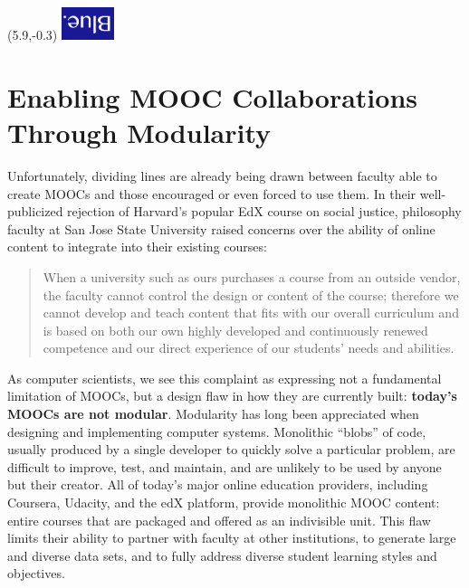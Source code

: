 

\def\thetitle{Enabling MOOC Collaborations Through Modularity}
\def\shorttitle{Modular MOOCs}
\def\theauthors{Geoffrey Challen (\textit{University at Buffalo}) and Margo
Seltzer (\textit{Harvard University})}
\def\shortauthors{Challen}
\def\submissiondate{04/07/2014}
\def\whitepapername{Learning with MOOCs}



\ifdefined\isblue
\begin{textblock}{1}(5.9,-0.3)
\noindent\href{http://blue.cse.buffalo.edu}{\includegraphics[width=0.6in]{./figures/logos/blue.jpg}}
\end{textblock}
\else
\fi

\pagestyle{whitepaper}
\thispagestyle{emptywhitepaper}

\chapter{\thetitle}



Unfortunately, dividing lines are already being drawn
between faculty able to create MOOCs and those encouraged or even forced to
use them. In their well-publicized rejection of Harvard's popular EdX course
on social justice, philosophy faculty at San Jose State University raised
concerns over the ability of online content to integrate into their existing
courses:

\begin{quote}

When a university such as ours purchases a course from an outside vendor, the
faculty cannot control the design or content of the course; therefore we
cannot develop and teach content that fits with our overall curriculum and is
based on both our own highly developed and continuously renewed competence
and our direct experience of our students' needs and abilities.

\end{quote}

As computer scientists, we see this complaint as expressing not a fundamental
limitation of MOOCs, but a design flaw in how they are currently built:
\textbf{today's MOOCs are not modular}. Modularity has long been appreciated
when designing and implementing computer systems. Monolithic ``blobs'' of
code, usually produced by a single developer to quickly solve a particular
problem, are difficult to improve, test, and maintain, and are unlikely to be
used by anyone but their creator. All of today's major online education
providers, including Coursera, Udacity, and the edX platform, provide
monolithic MOOC content: entire courses that are packaged and offered as an
indivisible unit. This flaw limits their ability to partner with faculty at
other institutions, to generate large and diverse data sets, and to fully
address diverse student learning styles and objectives.

